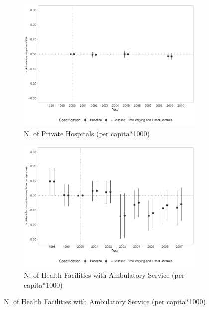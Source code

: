 \begin{figure}[h!]
\begin{center}
\begin{subfigure}{0.48\textwidth}
    \end{subfigure}
    \begin{subfigure}{0.48\textwidth}
        \centering
        \caption{\scriptsize N. of Private Hospitals (per capita*1000)}\label{fig:11c}
        \includegraphics[width=\textwidth]{plots/ams_hospital_pvt_pcapita_dist_ec29_baseline_dist_ec29_baseline_11.pdf}
    \end{subfigure}
    \begin{subfigure}{0.48\textwidth}
        \centering
        \caption{\scriptsize N. of Health Facilities with Ambulatory Service (per capita*1000)}\label{fig:11d}
        \includegraphics[width=\textwidth]{plots/sia_ncnes_amb_mun_pcapita_dist_ec29_baseline_dist_ec29_baseline_11.pdf}
    \end{subfigure}
    

\end{center}
\end{figure}
